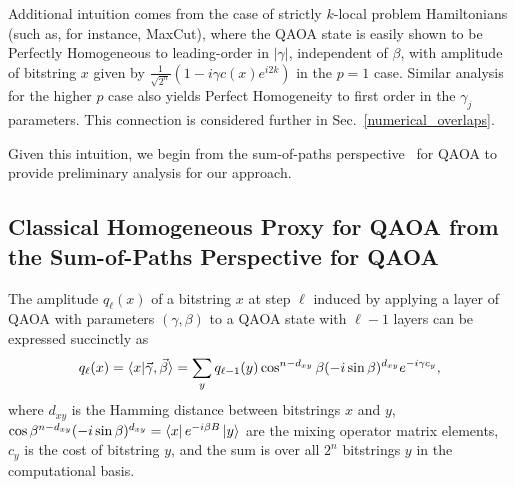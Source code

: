 \documentclass[superscriptaddress,pra,aps,10pt,longbibliography,notitlepage]{revtex4-1}
\begin{document}
Additional intuition comes from the case of strictly $k$-local problem Hamiltonians (such as, for instance, MaxCut), where the QAOA state is easily shown to be Perfectly Homogeneous to leading-order in $|\gamma|$, independent of $\beta$, with amplitude of bitstring $x$ given by $\frac{1}{\sqrt{2^n}} ( 1-i\gamma c(x) e^{i 2k})$ in the $p=1$ case. Similar analysis for the higher $p$ case also yields Perfect Homogeneity to first order in the $\gamma_j$ parameters. This connection is considered further in Sec.~\ref{numerical_overlaps}.

Given this intuition, we begin from the sum-of-paths perspective~\cite{hadfield2021analytical} for QAOA to provide preliminary analysis for our approach. 


\subsection{Classical Homogeneous Proxy for QAOA 
from the Sum-of-Paths Perspective for QAOA}\label{sum_of_paths_perspective}

The amplitude $q_{\ell}(x)$ of a bitstring $x$ at step $\ell$ induced by applying a layer of QAOA with parameters $(\gamma, \beta)$ to a QAOA state with $\ell-1$ layers can be expressed succinctly as~\cite{hadfield2021analytical}
\begin{equation}\label{eq:general_amp_sop}
    q_{\ell}(x) = \braket{x|\vec{\gamma},\vec{\beta}}=\sum_y q_{\ell-1}(y) \cos^{n-d_{xy}}\beta(-i\sin\beta)^{d_{xy}} e^{-i\gamma c_y}, 
\end{equation}
where $d_{xy}$ is the Hamming distance between bitstrings $x$ and $y$, $\cos\beta^{n-d_{xy}}(-i\sin\beta)^{d_{xy}}=\bra{x}e^{-i\beta B} \ket{y}$ are the mixing operator matrix elements, $c_y$ is the cost of bitstring $y$, and the sum is over all $2^n$ bitstrings $y$ in the computational basis.
\end{document}
